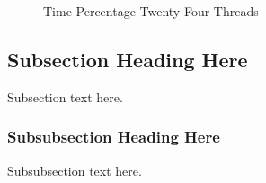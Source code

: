 \documentclass[journal]{IEEEtran}
\begin{document}
\begin{figure}[!t]
  \caption{Time Percentage Twenty Four Threads}
  \label{fig:timepertwentyfour}
\end{figure}

\subsection{Subsection Heading Here}
Subsection text here.


\subsubsection{Subsubsection Heading Here}
Subsubsection text here.


%
%



%
%
\end{document}
